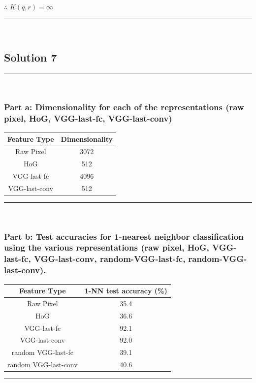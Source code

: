 \documentclass{article}
\begin{document}
\subsubsection*{\normalfont}{$\therefore$ $K(q, r) = \infty$}

\noindent\rule{\textwidth}{0.4pt}\\

\newpage
\subsection*{Solution 7}
\noindent\rule{\textwidth}{0.4pt}\\
\subsubsection*{Part a: Dimensionality for each of the representations (raw pixel, HoG, VGG-last-fc, VGG-last-conv)}
\begin{center} 
  \begin{tabular}{|c|c|} 
    \hline Feature Type & Dimensionality \\ 
    \hline 
    Raw Pixel & 3072 \\ 
    HoG & 512  \\
    VGG-last-fc & 4096 \\
    VGG-last-conv & 512 \\ 
    \hline
  \end{tabular}
\end{center}

\noindent\rule{\textwidth}{0.4pt}\\

\subsubsection*{Part b: Test accuracies for 1-nearest neighbor classification using the various representations (raw pixel, HoG, VGG-last-fc, VGG-last-conv, random-VGG-last-fc, random-VGG-last-conv).}
\begin{center} 
  \begin{tabular}{|c|c|} 
    \hline Feature Type & 1-NN test accuracy (\%) \\ 
    \hline 
    Raw Pixel & 35.4 \\ 
    HoG & 36.6  \\
    VGG-last-fc & 92.1 \\
    VGG-last-conv & 92.0 \\
    random VGG-last-fc & 39.1 \\
    random VGG-last-conv & 40.6 \\ 
    \hline
  \end{tabular}
\end{center}
\noindent\rule{\textwidth}{0.4pt}\\
\end{document}
